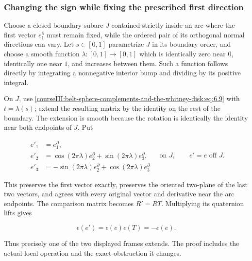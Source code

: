 \subsubsection{Changing the sign while fixing the prescribed first direction}
\label{courseIII:belt-sphere-complements-and-the-whitney-disk:section-6.4}

Choose a closed boundary subarc \(J\) contained strictly inside an arc where the first vector \(e_1^\partial\) must remain fixed, while the ordered pair of its orthogonal normal directions can vary. Let \(s\in[0,1]\) parametrize \(J\) in its boundary order, and choose a smooth function \(\lambda:[0,1]\to[0,1]\) which is identically zero near \(0\), identically one near \(1\), and increases between them. Such a function follows directly by integrating a nonnegative interior bump and dividing by its positive integral.

On \(J\), use \eqref{courseIII:belt-sphere-complements-and-the-whitney-disk:eq:6.9} with \(t=\lambda(s)\); extend the resulting matrix by the identity on the rest of the boundary. The extension is smooth because the rotation is identically the identity near both endpoints of \(J\). Put

\begin{equation}
\begin{aligned}
e'_1&=e^\partial_1,\\
e'_2&=\cos(2\pi\lambda)e^\partial_2+
             \sin(2\pi\lambda)e^\partial_3,\\
e'_3&=-\sin(2\pi\lambda)e^\partial_2+
             \cos(2\pi\lambda)e^\partial_3
\end{aligned}
\quad\text{on }J,\qquad e'=e\text{ off }J.
\label{courseIII:belt-sphere-complements-and-the-whitney-disk:eq:6.12}
\end{equation}

This preserves the first vector exactly, preserves the oriented two-plane of the last two vectors, and agrees with every original vector and derivative near the arc endpoints. The comparison matrix becomes \(R'=RT\). Multiplying its quaternion lifts gives

\begin{equation}
\epsilon(e')=\epsilon(e)\epsilon(T)=-\epsilon(e).
\label{courseIII:belt-sphere-complements-and-the-whitney-disk:eq:6.13}
\end{equation}

Thus precisely one of the two displayed frames extends. The proof includes the actual local operation and the exact obstruction it changes.

